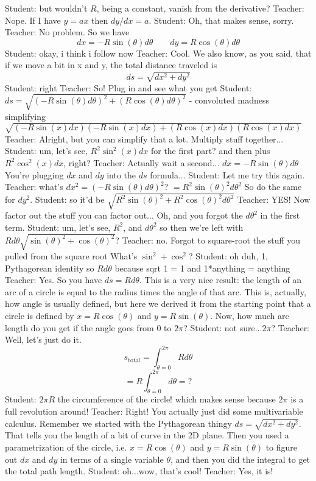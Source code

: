 Student: but wouldn't $R$, being a constant, vanish from the derivative?
Teacher: Nope. If I have $y = a x$ then $dy/dx = a$.
Student: Oh, that makes sense, sorry.
Teacher: No problem. So we have $$dx = - R \sin(\theta) d\theta \qquad dy = R \cos(\theta) d\theta$$
Student: okay, i think i follow now
Teacher: Cool. We also know, as you said, that if we move a bit in x and y, the total distance traveled is $$ds = \sqrt{dx^2 + dy^2}$$
Student: right
Teacher: So! Plug in and see what you get 
Student: $ds = \sqrt{(-R\sin(\theta)d\theta)^2+(R\cos(\theta)d\theta)^2}$ - convoluted madness
simplifying
$\sqrt{(-R\sin (x)dx)(-R\sin(x)dx)+(R\cos(x)dx)(R\cos(x)dx)}$
Teacher: Alright, but you can simplify that a lot. Multiply stuff together...
Student: um, let's see, $R^2 \sin^2(x)dx$ for the first part?
and then plus $R^2\cos^2(x)dx$, right?
Teacher: Actually wait a second... $dx = -R \sin(\theta) d\theta$
You're plugging $dx$ and $dy$ into the $ds$ formula...
Student: Let me try this again.
Teacher: what's $dx^2 = (-R \sin(\theta) d\theta)^2$? $= R^2 \sin(\theta)^2 d\theta^2$
So do the same for $dy^2$.
Student: so it'd be $\sqrt{R^2\sin(\theta)^2+R^2\cos(\theta)^2d\theta^2}$
Teacher: YES!
Now factor out the stuff you can factor out...
Oh, and you forgot the $d\theta^2$ in the first term.
Student: um, let's see, $R^2$, and $d\theta^2$
so then we're left with $Rd\theta\sqrt{\sin(\theta)^2+\cos(\theta)^2}$?
Teacher: no. Forgot to square-root the stuff you pulled from the square root 
What's $\sin^2 + \cos^2$?
Student: oh duh, 1, Pythagorean identity
so $Rd\theta$
because sqrt 1 = 1
and 1*anything = anything
Teacher: Yes.
So you have $ds = R d\theta$.
This is a very nice result: the length of an arc of a circle is equal to the radius times the angle of that arc.
This is, actually, how angle is usually defined, but here we derived it from the starting point that a circle is defined by $x = R \cos(\theta)$ and $y = R \sin(\theta)$.
Now, how much arc length do you get if the angle goes from 0 to $2\pi$?
Student: not sure...$2\pi$?
Teacher: Well, let's just do it. $$s_\text{total} = \int_{\theta=0}^{2\pi} R d\theta$$
$$=R \int_{\theta=0}^{2\pi} d \theta = ?$$
Student: $2\pi R$
the circumference of the circle!
which makes sense because $2\pi$ is a full revolution around!
Teacher: Right! You actually just did some multivariable calculus.
Remember we started with the Pythagorean thingy $ds = \sqrt{dx^2 + dy^2}$.
That tells you the length of a bit of curve in the 2D plane.
Then you used a parametrization of the circle, i.e. $x = R \cos(\theta)$ and $y = R \sin(\theta)$ to figure out $dx$ and $dy$ in terms of a single variable $\theta$, and then you did the integral to get the total path length.
Student: oh...wow, that's cool!
Teacher: Yes, it is!
